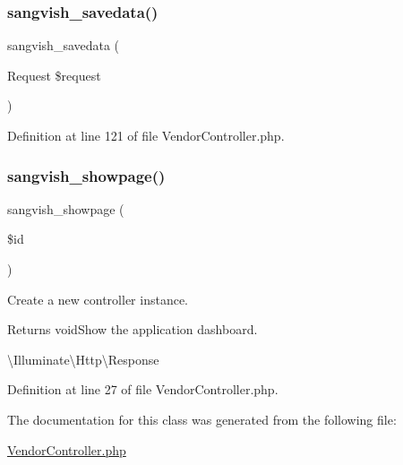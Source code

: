 \subsubsection{\texorpdfstring{sangvish\_savedata()}{sangvish\_savedata()}}
{\footnotesize\ttfamily sangvish\+\_\+savedata (\begin{DoxyParamCaption}\item[{Request}]{\$request }\end{DoxyParamCaption})\hspace{0.3cm}{\ttfamily [protected]}}



Definition at line 121 of file Vendor\+Controller.\+php.

\mbox{\label{class_responsive_1_1_http_1_1_controllers_1_1_vendor_controller_a25c26d79ff97b25376137ed6c25cab21}} 
\subsubsection{\texorpdfstring{sangvish\_showpage()}{sangvish\_showpage()}}
{\footnotesize\ttfamily sangvish\+\_\+showpage (\begin{DoxyParamCaption}\item[{}]{\$id }\end{DoxyParamCaption})}

Create a new controller instance.

\begin{DoxyReturn}{Returns}
void\+Show the application dashboard.

\textbackslash{}\+Illuminate\textbackslash{}\+Http\textbackslash{}\+Response 
\end{DoxyReturn}


Definition at line 27 of file Vendor\+Controller.\+php.



The documentation for this class was generated from the following file\+:\begin{DoxyCompactItemize}
\item 
\mbox{\hyperlink{_vendor_controller_8php}{Vendor\+Controller.\+php}}\end{DoxyCompactItemize}
